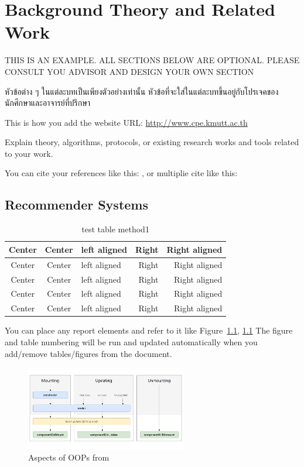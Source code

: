 \chapter{Background Theory and Related Work}

THIS IS AN EXAMPLE. ALL SECTIONS BELOW ARE OPTIONAL. PLEASE CONSULT YOU ADVISOR AND DESIGN YOUR OWN SECTION

\textthai{หัวข้อต่าง ๆ ในแต่ละบทเป็นเพียงตัวอย่างเท่านั้น หัวข้อที่จะใส่ในแต่ละบทขึ้นอยู่กับโปรเจคของนักศึกษาและอาจารย์ที่ปรึกษา}

This is how you add the website URL: \url{http://www.cpe.kmutt.ac.th}

Explain theory, algorithms, protocols, or existing research works and tools related to your work.

You can cite your references like this: \cite{booch87}, or multiplie cite like this: \cite{meyer2000, atwoodmd}

\section{Recommender Systems}

    \begin{table}[!h]
    \caption{test table method1}\label{tbl:method1}
        \begin{tabular}{c|c|l|rr} \hline\hline
            Center & Center & left aligned & Right & Right aligned \\ \hline\hline
            Center & Center & left aligned & Right & Right aligned \\ \hline
            Center & Center & left aligned & Right & Right aligned \\ 
            Center & Center & left aligned & Right & Right aligned \\ \hline
            Center & Center & left aligned & Right & Right aligned \\ \hline\hline
        \end{tabular}
    \end{table}

    You can place any report elements and refer to it like Figure~\ref{tbl:method1}, \ref{fig:oop-concept}
    The figure and table numbering will be run and updated automatically when you add/remove tables/figures from the document.

    \begin{figure}[H]
        \centering
        \includegraphics[width=7cm]{chapters/2/figures/react-lifecycle.png}
        \caption[Aspects of OOPs]{Aspects of OOPs from~\cite{apollo22oop}}
        \label{fig:oop-concept}
    \end{figure}
    
